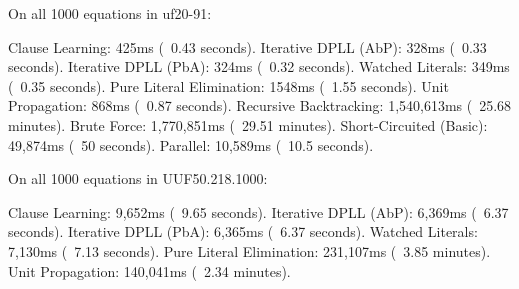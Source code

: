 \begin{FVerbatim}
On all 1000 equations in uf20-91:

Clause Learning:           425ms (~0.43 seconds).
Iterative DPLL (AbP):      328ms (~0.33 seconds).
Iterative DPLL (PbA):      324ms (~0.32 seconds).
Watched Literals:          349ms (~0.35 seconds).
Pure Literal Elimination:  1548ms (~1.55 seconds).
Unit Propagation:          868ms (~0.87 seconds).
Recursive Backtracking:    1,540,613ms (~25.68 minutes).
Brute Force:               1,770,851ms (~29.51 minutes).
Short-Circuited (Basic):   49,874ms (~50 seconds).
Parallel:                  10,589ms (~10.5 seconds).

On all 1000 equations in UUF50.218.1000:

Clause Learning:          9,652ms (~9.65 seconds).
Iterative DPLL (AbP):     6,369ms (~6.37 seconds).
Iterative DPLL (PbA):     6,365ms (~6.37 seconds).
Watched Literals:         7,130ms (~7.13 seconds).
Pure Literal Elimination: 231,107ms (~3.85 minutes).
Unit Propagation:         140,041ms (~2.34 minutes).
\end{FVerbatim}

